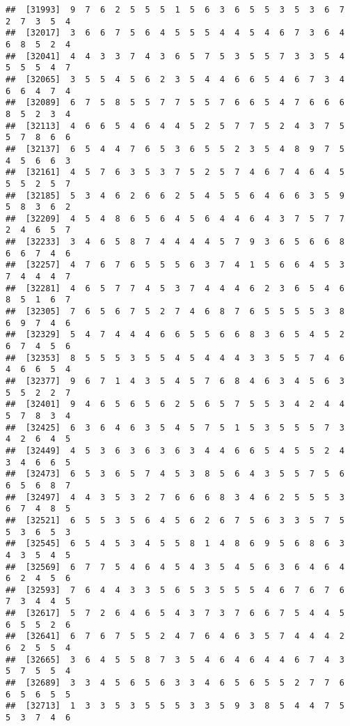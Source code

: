 \documentclass[
]{book}
\begin{document}
\begin{verbatim}
##  [31993]  9  7  6  2  5  5  5  1  5  6  3  6  5  5  3  5  3  6  7  2  7  3  5  4
##  [32017]  3  6  6  7  5  6  4  5  5  5  4  4  5  4  6  7  3  6  4  6  8  5  2  4
##  [32041]  4  4  3  3  7  4  3  6  5  7  5  3  5  5  7  3  3  5  4  5  5  5  4  7
##  [32065]  3  5  5  4  5  6  2  3  5  4  4  6  6  5  4  6  7  3  4  6  6  4  7  4
##  [32089]  6  7  5  8  5  5  7  7  5  5  7  6  6  5  4  7  6  6  6  8  5  2  3  4
##  [32113]  4  6  6  5  4  6  4  4  5  2  5  7  7  5  2  4  3  7  5  5  7  8  6  6
##  [32137]  6  5  4  4  7  6  5  3  6  5  5  2  3  5  4  8  9  7  5  4  5  6  6  3
##  [32161]  4  5  7  6  3  5  3  7  5  2  5  7  4  6  7  4  6  4  5  5  5  2  5  7
##  [32185]  5  3  4  6  2  6  6  2  5  4  5  5  6  4  6  6  3  5  9  5  8  3  6  2
##  [32209]  4  5  4  8  6  5  6  4  5  6  4  4  6  4  3  7  5  7  7  2  4  6  5  7
##  [32233]  3  4  6  5  8  7  4  4  4  4  5  7  9  3  6  5  6  6  8  6  6  7  4  6
##  [32257]  4  7  6  7  6  5  5  5  6  3  7  4  1  5  6  6  4  5  3  7  4  4  4  7
##  [32281]  4  6  5  7  7  4  5  3  7  4  4  4  6  2  3  6  5  4  6  8  5  1  6  7
##  [32305]  7  6  5  6  7  5  2  7  4  6  8  7  6  5  5  5  5  3  8  6  9  7  4  6
##  [32329]  5  4  7  4  4  4  6  6  5  5  6  6  8  3  6  5  4  5  2  6  7  4  5  6
##  [32353]  8  5  5  5  3  5  5  4  5  4  4  4  3  3  5  5  7  4  6  4  6  6  5  4
##  [32377]  9  6  7  1  4  3  5  4  5  7  6  8  4  6  3  4  5  6  3  5  5  2  2  7
##  [32401]  9  4  6  5  6  5  6  2  5  6  5  7  5  5  3  4  2  4  4  5  7  8  3  4
##  [32425]  6  3  6  4  6  3  5  4  5  7  5  1  5  3  5  5  5  7  3  4  2  6  4  5
##  [32449]  4  5  3  6  3  6  3  6  3  4  4  6  6  5  4  5  5  2  4  3  4  6  6  5
##  [32473]  6  5  3  6  5  7  4  5  3  8  5  6  4  3  5  5  7  5  6  6  5  6  8  7
##  [32497]  4  4  3  5  3  2  7  6  6  6  8  3  4  6  2  5  5  5  3  6  7  4  8  5
##  [32521]  6  5  5  3  5  6  4  5  6  2  6  7  5  6  3  3  5  7  5  5  3  6  5  3
##  [32545]  6  5  4  5  3  4  5  5  8  1  4  8  6  9  5  6  8  6  3  4  3  5  4  5
##  [32569]  6  7  7  5  4  6  4  5  4  3  5  4  5  6  3  6  4  6  4  6  2  4  5  6
##  [32593]  7  6  4  4  3  3  5  6  5  3  5  5  5  4  6  7  6  7  6  7  3  4  4  5
##  [32617]  5  7  2  6  4  6  5  4  3  7  3  7  6  6  7  5  4  4  5  6  5  5  2  6
##  [32641]  6  7  6  7  5  5  2  4  7  6  4  6  3  5  7  4  4  4  2  6  2  5  5  4
##  [32665]  3  6  4  5  5  8  7  3  5  4  6  4  6  4  4  6  7  4  3  5  7  5  5  4
##  [32689]  3  3  4  5  6  5  6  3  3  4  6  5  6  5  5  2  7  7  6  6  5  6  5  5
##  [32713]  1  3  3  5  3  5  5  5  3  3  5  9  3  8  5  4  4  7  5  5  3  7  4  6

\end{verbatim}
\end{document}
